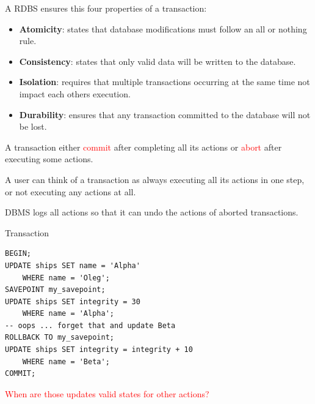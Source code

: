 \documentclass{beamer}
\newcommand{\red}[1]{
\textcolor{red}{#1}
}
\begin{document}
\begin{slide}{
\item A RDBS ensures this four properties of a transaction:
\begin{itemize}
	\item \textbf{Atomicity}: states that database modifications must follow an all or nothing rule.
	\pause
	\item \textbf{Consistency}: states that only valid data will be written to the database.
	\pause
	\item \textbf{Isolation}: requires that multiple transactions occurring at the same time not impact each others execution.
	\pause
	\item \textbf{Durability}: ensures that any transaction committed to the database will not be lost. 	
\end{itemize}
}\end{slide}

\begin{slide}{
\item A transaction either \red{commit} after completing all its actions or \red{abort} after executing some actions.
\item A user can think of a transaction as always executing all its actions in one step, or not executing any actions at all.
\item DBMS logs all actions so that it can undo the actions of aborted transactions.		
}\end{slide}

\begin{frame}[fragile]{Transaction}
\begin{lstlisting}
BEGIN;
UPDATE ships SET name = 'Alpha'
	WHERE name = 'Oleg';
SAVEPOINT my_savepoint;
UPDATE ships SET integrity = 30
	WHERE name = 'Alpha';
-- oops ... forget that and update Beta 
ROLLBACK TO my_savepoint;
UPDATE ships SET integrity = integrity + 10
	WHERE name = 'Beta';
COMMIT;		
\end{lstlisting}
\red{When are those updates valid states for other actions?}  
\end{frame}	
\end{document}
